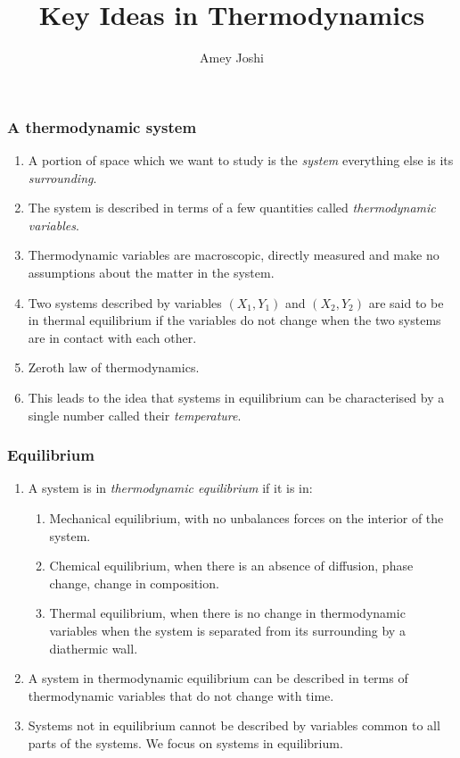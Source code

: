 \documentclass{beamer}
\title{Key Ideas in Thermodynamics}
\author{Amey Joshi}
\begin{document}
\frame{\titlepage}

\begin{frame}
\frametitle{A thermodynamic system}
\begin{enumerate}
\item A portion of space which we want to study is the \emph{system} everything else is its \emph{surrounding}.
\item The system is described in terms of a few quantities called \emph{thermodynamic variables}.
\item Thermodynamic variables are macroscopic, directly measured and make no assumptions about the matter in the system.
\item Two systems described by variables $(X_1, Y_1)$ and $(X_2, Y_2)$ are said to be in thermal equilibrium if the variables do
not change when the two systems are in contact with each other.
\item Zeroth law of thermodynamics.
\item This leads to the idea that systems in equilibrium can be characterised by a single number called their \emph{temperature}.
\end{enumerate}
\end{frame}

\begin{frame}
\frametitle{Equilibrium}
\begin{enumerate}
\item A system is in \emph{thermodynamic equilibrium} if it is in:
\begin{enumerate}
\item Mechanical equilibrium, with no unbalances forces on the interior of the system.
\item Chemical equilibrium, when there is an absence of diffusion, phase change, change in composition.
\item Thermal equilibrium, when there is no change in thermodynamic variables when the system is separated from its surrounding
by a diathermic wall.
\end{enumerate}
\item A system in thermodynamic equilibrium can be described in terms of thermodynamic variables that do not change with time.
\item Systems not in equilibrium cannot be described by variables common to all parts of the systems. We focus on systems in 
equilibrium.
\end{enumerate}
\end{frame}
\end{document}
